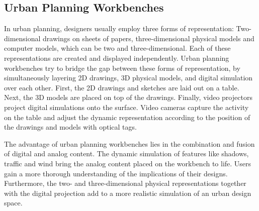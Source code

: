 \subsection{Urban Planning Workbenches}
In urban planning, designers usually employ three forms of representation: Two-dimensional drawings on sheets of papers, three-dimensional physical models and computer models, which can be two and three-dimensional. Each of these representations are created and displayed independently. Urban planning workbenches try to bridge the gap between these forms of representation, by simultaneously layering 2D drawings, 3D physical models, and digital simulation over each other. 
First, the 2D drawings and sketches are laid out on a table. Next, the 3D models are placed on top of the drawings. Finally, video projectors project digital simulations onto the surface. Video cameras capture the activity on the table and adjust the dynamic representation according to the position of the drawings and models with optical tags. \cite{ishii02}

The advantage of urban planning workbenches lies in the combination and fusion of digital and analog content. The dynamic simulation of features like shadows, traffic and wind bring the analog content placed on the workbench to life. Users gain a more thorough understanding of the implications of their designs. Furthermore, the two- and three-dimensional physical representations together with the digital projection add to a more realistic simulation of an urban design space.\cite{ishii02}

